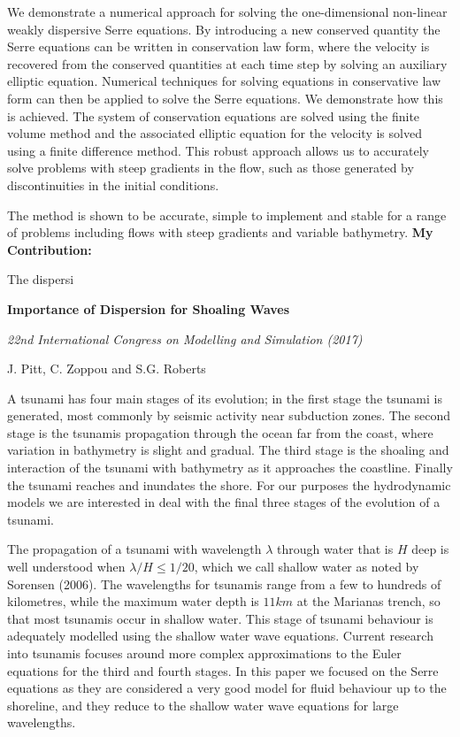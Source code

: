 We demonstrate a numerical approach for solving the one-dimensional non-linear weakly dispersive Serre equations. By introducing a new conserved quantity the Serre equations can be written in conservation law form, where the velocity is recovered from the conserved quantities at each time step by solving an auxiliary elliptic equation. Numerical techniques for solving equations in conservative law form can then be applied to solve the	Serre equations. We demonstrate how this is achieved. The system of conservation equations are solved using the finite volume method and the associated elliptic equation for the velocity is solved using a finite difference method. This robust approach allows us to accurately solve problems with steep gradients in the flow, such as those generated by discontinuities in the initial conditions.

The method is shown to be accurate, simple to implement and stable for a range of problems including flows with steep gradients and variable bathymetry.
\newline
\textbf{My Contribution:}

The dispersi

\newpage

\begin{center}
	\textbf{
		\Large Importance of Dispersion for Shoaling Waves}
	
	\vspace*{\baselineskip}
	
	\textit{22nd International Congress on Modelling and Simulation (2017)}
	
	{J. Pitt, C. Zoppou and S.G. Roberts}
	\vspace*{0.5\baselineskip}
\end{center}
A tsunami has four main stages of its evolution; in the first stage the tsunami is generated, most commonly by seismic activity near subduction zones. The second stage is the tsunamis propagation through the ocean far from the coast, where variation in bathymetry is slight and gradual. The third stage is the shoaling and interaction of the tsunami with bathymetry as it approaches the coastline. Finally the tsunami reaches and inundates the shore. For our purposes the hydrodynamic models we are interested in deal with the final three stages of the evolution of a tsunami.

The propagation of a tsunami with wavelength $\lambda$ through water that is $H$ deep is well understood when $\lambda / H \le 1/ 20$, which we call shallow water as noted by Sorensen (2006). The wavelengths for tsunamis range from a few to hundreds of kilometres, while the maximum water depth is $11km$ at the Marianas trench, so that most tsunamis occur in shallow water. This stage of tsunami behaviour is adequately modelled using the shallow water wave equations. Current research into tsunamis focuses around more complex approximations to the Euler equations for the third and fourth stages. In this paper we focused on the Serre equations as they are considered a very good model for fluid behaviour up to the shoreline, and they reduce to the shallow water wave equations for large wavelengths. 

